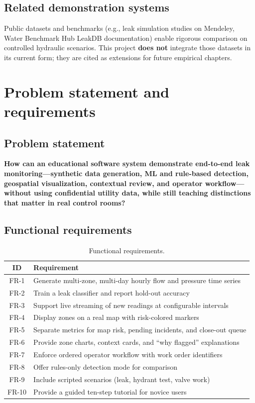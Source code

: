 \documentclass[12pt,a4paper]{article}
\begin{document}
\subsection{Related demonstration systems}

Public datasets and benchmarks (e.g., leak simulation studies on Mendeley, Water Benchmark Hub LeakDB documentation) enable rigorous comparison on controlled hydraulic scenarios. This project \textbf{does not} integrate those datasets in its current form; they are cited as extensions for future empirical chapters.

\section{Problem statement and requirements}
\label{sec:problem}

\subsection{Problem statement}

\textbf{How can an educational software system demonstrate end-to-end leak monitoring---synthetic data generation, ML and rule-based detection, geospatial visualization, contextual review, and operator workflow---without using confidential utility data, while still teaching distinctions that matter in real control rooms?}

\subsection{Functional requirements}

\begin{table}[htbp]
\centering
\caption{Functional requirements.}
\label{tab:fr}
\begin{tabular}{@{}cl@{}}
\toprule
\textbf{ID} & \textbf{Requirement} \\
\midrule
FR-1 & Generate multi-zone, multi-day hourly flow and pressure time series \\
FR-2 & Train a leak classifier and report hold-out accuracy \\
FR-3 & Support live streaming of new readings at configurable intervals \\
FR-4 & Display zones on a real map with risk-colored markers \\
FR-5 & Separate metrics for map risk, pending incidents, and close-out queue \\
FR-6 & Provide zone charts, context cards, and ``why flagged'' explanations \\
FR-7 & Enforce ordered operator workflow with work order identifiers \\
FR-8 & Offer rules-only detection mode for comparison \\
FR-9 & Include scripted scenarios (leak, hydrant test, valve work) \\
FR-10 & Provide a guided ten-step tutorial for novice users \\
\bottomrule
\end{tabular}
\end{table}
\end{document}
